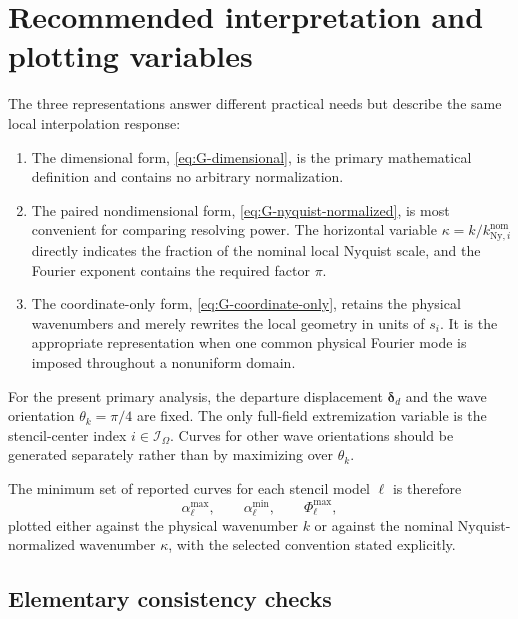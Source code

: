 \documentclass[11pt]{article}
\numberwithin{equation}{section}
\begin{document}
\section{Recommended interpretation and plotting variables}
\label{sec:recommendations}

The three representations answer different practical needs but describe the same local interpolation response:
\begin{enumerate}[label=(\roman*),leftmargin=2.2em]
    \item The dimensional form, \cref{eq:G-dimensional}, is the primary mathematical definition and contains no arbitrary normalization.
    \item The paired nondimensional form, \cref{eq:G-nyquist-normalized}, is most convenient for comparing resolving power. The horizontal variable $\kappa=k/k_{\mathrm{Ny},i}^{\mathrm{nom}}$ directly indicates the fraction of the nominal local Nyquist scale, and the Fourier exponent contains the required factor $\pi$.
    \item The coordinate-only form, \cref{eq:G-coordinate-only}, retains the physical wavenumbers and merely rewrites the local geometry in units of $s_i$. It is the appropriate representation when one common physical Fourier mode is imposed throughout a nonuniform domain.
\end{enumerate}

For the present primary analysis, the departure displacement $\bm{\delta}_d$ and the wave orientation $\theta_k=\pi/4$ are fixed. The only full-field extremization variable is the stencil-center index $i\in\mathcal I_{\Omega}$. Curves for other wave orientations should be generated separately rather than by maximizing over $\theta_k$.

The minimum set of reported curves for each stencil model $\ell$ is therefore
\begin{equation}
    \alpha_{\ell}^{\max},
    \qquad
    \alpha_{\ell}^{\min},
    \qquad
    \Phi_{\ell}^{\max},
    \label{eq:recommended-curves}
\end{equation}
plotted either against the physical wavenumber $k$ or against the nominal Nyquist-normalized wavenumber $\kappa$, with the selected convention stated explicitly.

\subsection*{Elementary consistency checks}
\end{document}
